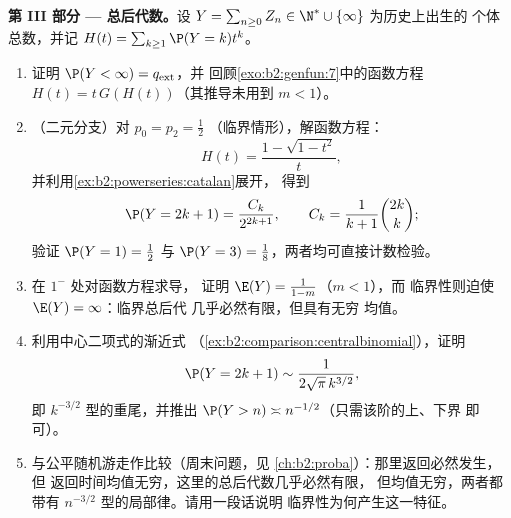 \begin{problem}
\medskip
\noindent\textbf{第 III 部分 --- 总后代数。}设 $Y =
\sum_{n\geq0}Z_n \in \N^* \cup \{\infty\}$ 为历史上出生的
个体总数，并记 $H(t) =
\sum_{k\geq1}\P(Y = k)t^k$。
\begin{enumerate}[resume]
  \item 证明 $\P(Y < \infty) = q_{\mathrm{ext}}$，并
        回顾\cref{exo:b2:genfun:7}中的函数方程
        $H(t) = t\,G(H(t))$（其推导未用到
        $m < 1$）。
  \item （二元分支）对 $p_0 = p_2 = \frac12$
        （临界情形），解函数方程：
        \[
        H(t) = \frac{1 - \sqrt{1 - t^2}}{t},
        \]
        并利用\cref{ex:b2:powerseries:catalan}展开，
        得到
        \[
        \P(Y = 2k + 1) = \frac{C_k}{2^{2k+1}},
        \qquad C_k = \frac1{k+1}\binom{2k}k ;
        \]
        验证 $\P(Y = 1) = \frac12$ 与 $\P(Y = 3)
        = \frac18$，两者均可直接计数检验。
  \item 在 $1^-$ 处对函数方程求导，
        证明 $\E(Y) = \frac{1}{1-m}$（$m < 1$），而
        临界性则迫使 $\E(Y) = \infty$：临界总后代
        几乎必然有限，但具有无穷
        均值。
  \item 利用中心二项式的渐近式
        （\cref{ex:b2:comparison:centralbinomial}），证明
        \[
        \P(Y = 2k+1) \sim \frac{1}{2\sqrt\pi\,k^{3/2}},
        \]
        即 $k^{-3/2}$ 型的重尾，并推出 $\P(Y > n)
        \asymp n^{-1/2}$（只需该阶的上、下界
        即可）。
  \item 与公平随机游走作比较（周末问题，见
        \cref{ch:b2:proba}）：那里返回必然发生，但
        返回时间均值无穷，这里的总后代数几乎必然有限，
        但均值无穷，两者都带有
        $n^{-3/2}$ 型的局部律。请用一段话说明
        临界性为何产生这一特征。
\end{enumerate}


\end{problem}
